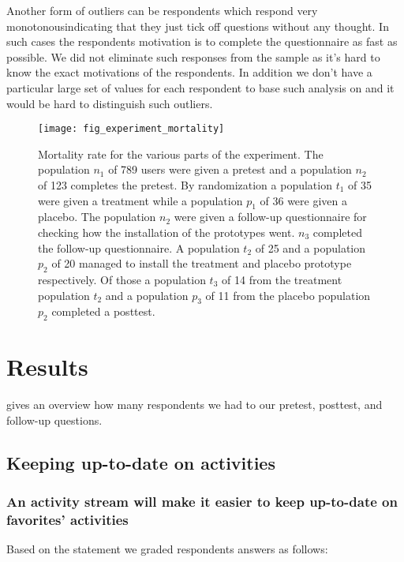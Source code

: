 Another form of outliers can be respondents which respond very
monotonous\dash{}indicating that they just tick off questions without any
thought. In such cases the respondents motivation is to complete the
questionnaire as fast as possible. We did not eliminate such responses from
the sample as it's hard to know the exact motivations of the respondents.
In addition we don't have a particular large set of values for each respondent
to base such analysis on and it would be hard to distinguish such outliers.

\begin{figure}
  \texttt{[image: fig\_experiment\_mortality]}
  \caption[Experiment Mortality Rate]{
    Mortality rate for the various parts of the experiment.
    The population $n_1$ of 789 \urort{} users were given a pretest and
    a population $n_2$ of 123 completes the pretest.
    By randomization a population $t_1$ of 35 were given a treatment while
    a population $p_1$ of 36 were given a placebo.
    The population $n_2$ were given a follow-up questionnaire for checking
    how the installation of the prototypes went. $n_3$ completed the follow-up
    questionnaire.
    A population $t_2$ of 25 and a population $p_2$ of 20 managed to install
    the treatment and placebo prototype respectively.
    Of those a population $t_3$ of 14 from the treatment population $t_2$ and
    a population $p_3$ of 11 from the placebo population $p_2$ completed
    a posttest.
  }
  \label{figure:fig.experiment.mortality}
\end{figure}

\section{Results}

 gives an overview how many respondents we
had to our pretest, posttest, and follow-up questions.

\subsection{Keeping up-to-date on activities}

\subsubsection{An activity stream will make it easier to keep up-to-date on
  favorites' activities}

Based on the statement
 we graded respondents answers as follows: 

